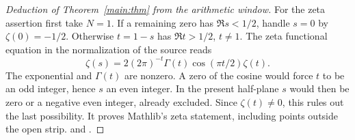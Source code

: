 \begin{proof}[Deduction of Theorem~\ref{main:thm} from the arithmetic window]
For the zeta assertion first take \(N=1\). If a remaining zero has \(\Re s<1/2\), handle \(s=0\) by \(\zeta(0)=-1/2\). Otherwise \(t=1-s\) has \(\Re t>1/2\), \(t\ne1\). The zeta functional equation in the normalization of the source reads
\[
 \zeta(s)=2(2\pi)^{-t}\Gamma(t)\cos(\pi t/2)\zeta(t).
\]
The exponential and \(\Gamma(t)\) are nonzero. A zero of the cosine would force \(t\) to be an odd integer, hence \(s\) an even integer. In the present half-plane \(s\) would then be zero or a negative even integer, already excluded. Since \(\zeta(t)\ne0\), this rules out the last possibility. It proves Mathlib's zeta statement, including points outside the open strip.  and .
\end{proof}
